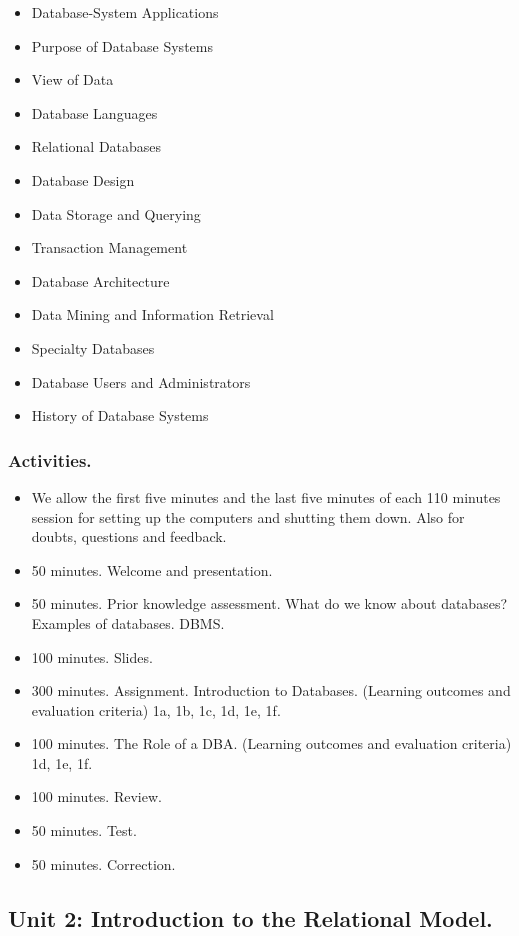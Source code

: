 \documentclass[catalan, a4paper, 12pt, titlepage]{article}
\begin{document}
  \begin{itemize}
	  \item Database-System Applications
	  \item Purpose of Database Systems
	  \item View of Data
	  \item Database Languages
	  \item Relational Databases
	  \item Database Design
	  \item Data Storage and Querying
	  \item Transaction Management
	  \item Database Architecture
	  \item Data Mining and Information Retrieval
	  \item Specialty Databases
	  \item Database Users and Administrators
	  \item History of Database Systems
  \end{itemize}
  
  \subsubsection{Activities.}

  \begin{itemize}
          \item We allow the first five minutes and the last five minutes of each 110 minutes session for setting up the computers and shutting them down. Also for doubts, questions and feedback.
	  \item 50 minutes. Welcome and presentation.
	  \item 50 minutes. Prior knowledge assessment. What do we know about databases? Examples of databases. DBMS.
	  \item 100 minutes. Slides.
	  \item 300 minutes. Assignment. Introduction to Databases.
		  (\faGraduationCap Learning outcomes and evaluation criteria) 1a, 1b, 1c, 1d, 1e, 1f.
	  \item 100 minutes. The Role of a DBA.
		  (\faGraduationCap Learning outcomes and evaluation criteria) 1d, 1e, 1f.
	  \item 100 minutes. Review.
	  \item 50 minutes. Test.
	  \item 50 minutes. Correction.
  \end{itemize}

  \subsection{Unit 2: Introduction to the Relational Model.}
\end{document}
